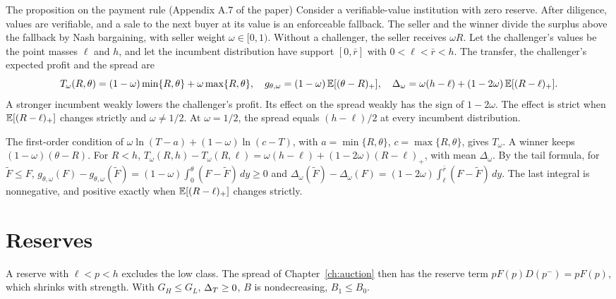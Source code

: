 {\small
\begin{paperresult}{The proposition on the payment rule (Appendix A.7 of the paper)}
Consider a verifiable-value institution with zero reserve. After diligence, values are verifiable, and a sale to the
next buyer at its value is an enforceable fallback. The seller and the winner divide the surplus above the fallback by
Nash bargaining, with seller weight \(\omega\in[0,1)\). Without a challenger, the seller receives \(\omega R\).
Let the challenger's values be the point masses \(\ell\) and \(h\), and let the incumbent distribution have support
\([0,\bar r]\) with \(0<\ell<\bar r<h\). The transfer, the challenger's expected profit and the spread are
\[
T_\omega(R,\theta)=(1-\omega)\min\{R,\theta\}+\omega\max\{R,\theta\},\quad
g_{\theta,\omega}=(1-\omega)\,\mathbb{E}[(\theta-R)_+],\quad
\Delta_\omega=\omega(h-\ell)+(1-2\omega)\,\mathbb{E}[(R-\ell)_+].
\]
A stronger incumbent weakly lowers the challenger's profit. Its effect on the spread weakly has the sign of
\(1-2\omega\). The effect is strict when \(\mathbb{E}[(R-\ell)_+]\) changes strictly and \(\omega\ne1/2\). At \(\omega=1/2\),
the spread equals \((h-\ell)/2\) at every incumbent distribution.
\end{paperresult}}

{\small\begin{derivation}[proof]
The first-order condition of \(\omega\ln(T-a)+(1-\omega)\ln(c-T)\), with \(a=\min\{R,\theta\}\),
\(c=\max\{R,\theta\}\), gives \(T_\omega\). A winner keeps \((1-\omega)(\theta-R)\). For \(R<h\),
\(T_\omega(R,h)-T_\omega(R,\ell)=\omega(h-\ell)+(1-2\omega)(R-\ell)_+\), with mean \(\Delta_\omega\). By the tail
formula, for \(\tilde F\le F\),
\(g_{\theta,\omega}(F)-g_{\theta,\omega}(\tilde F)=(1-\omega)\int_0^\theta(F-\tilde F)\,dy\ge0\) and
\(\Delta_\omega(\tilde F)-\Delta_\omega(F)=(1-2\omega)\int_\ell^{\bar r}(F-\tilde F)\,dy\).
The last integral is nonnegative, and positive exactly when \(\mathbb{E}[(R-\ell)_+]\) changes strictly.
\end{derivation}}

\section{Reserves}\label{sec:welfare-reserves}

A reserve with \(\ell<p<h\) excludes the low class. The spread of Chapter~\ref{ch:auction} then has the reserve term
\(pF(p)D(p^-)=pF(p)\), which shrinks with strength. With \(G_H\le G_L\), \(\Delta_T\ge0\), \(B\) is nondecreasing, \(B_1\le B_0\).

